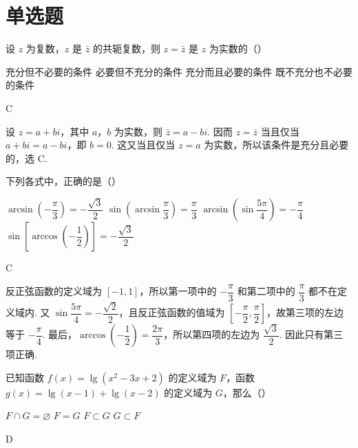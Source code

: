 \documentclass[UTF8,a4paper,oneside,11pt]{ctexbook}
\begin{document}
\section{单选题}

\begin{problem}

设 \(z\) 为复数，\(z\) 是 \(\bar{z}\) 的共轭复数，则 \(z=\bar{z}\) 是 \(z\) 为实数的（\quad）

\choices
    {充分但不必要的条件}
    {必要但不充分的条件}
    {充分而且必要的条件}
    {既不充分也不必要的条件}

\begin{answer}
C
\end{answer}
\end{problem}

\begin{solution}
设 \(z=a+bi\)，其中 \(a\)，\(b\) 为实数，则 \(\bar{z}=a-bi\). 因而 \(z=\bar{z}\) 当且仅当 \(a+bi=a-bi\)，即 \(b=0\). 这又当且仅当 \(z=a\) 为实数，所以该条件是充分且必要的，选 C.
\end{solution}

\begin{problem}

下列各式中，正确的是（\quad）

\choices
    {\(\arcsin\left(-\dfrac{\pi}{3}\right)=-\dfrac{\sqrt{3}}{2}\)}
    {\(\sin\left(\arcsin\dfrac{\pi}{3}\right)=\dfrac{\pi}{3}\)}
    {\(\arcsin\left(\sin\dfrac{5\pi}{4}\right)=-\dfrac{\pi}{4}\)}
    {\(\sin\left[\arccos\left(-\dfrac{1}{2}\right)\right]=-\dfrac{\sqrt{3}}{2}\)}

\begin{answer}
C
\end{answer}
\end{problem}

\begin{solution}
反正弦函数的定义域为 \([-1,1]\)，所以第一项中的 \(-\dfrac{\pi}{3}\) 和第二项中的 \(\dfrac{\pi}{3}\) 都不在定义域内. 又 \(\sin\dfrac{5\pi}{4}=-\dfrac{\sqrt{2}}{2}\)，且反正弦函数的值域为 \(\left[-\dfrac{\pi}{2},\dfrac{\pi}{2}\right]\)，故第三项的左边等于 \(-\dfrac{\pi}{4}\). 最后，\(\arccos\left(-\dfrac{1}{2}\right)=\dfrac{2\pi}{3}\)，所以第四项的左边为 \(\dfrac{\sqrt{3}}{2}\). 因此只有第三项正确.
\end{solution}

\begin{problem}

已知函数 \(f(x)=\lg\left(x^2-3x+2\right)\) 的定义域为 \(F\)，函数 \(g(x)=\lg(x-1)+\lg(x-2)\) 的定义域为 \(G\)，那么（\quad）

\choices
    {\(F\cap G=\varnothing\)}
    {\(F=G\)}
    {\(F\subset G\)}
    {\(G\subset F\)}

\begin{answer}
D
\end{answer}
\end{problem}
\end{document}

